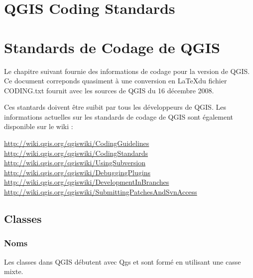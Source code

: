 
\section{QGIS Coding Standards}
\section{Standards de Codage de QGIS}


Le chapitre suivant fournie des informations de codage pour la version \CURRENT de QGIS.
Ce document correponds quasiment \`a une conversion en \LaTeX du fichier CODING.txt fournit 
avec les sources de QGIS du 16 d\'ecembre 2008.

Ces stantards doivent \^etre suibit par tous les d\'eveloppeurs de QGIS. Les informations actuelles
sur les standards de codage de QGIS sont \'egalement disponible sur le wiki :

\url{http://wiki.qgis.org/qgiswiki/CodingGuidelines} \\
\url{http://wiki.qgis.org/qgiswiki/CodingStandards} \\
\url{http://wiki.qgis.org/qgiswiki/UsingSubversion} \\
\url{http://wiki.qgis.org/qgiswiki/DebuggingPlugins} \\
\url{http://wiki.qgis.org/qgiswiki/DevelopmentInBranches} \\
\url{http://wiki.qgis.org/qgiswiki/SubmittingPatchesAndSvnAccess} \\

\subsection{Classes}
\subsubsection{Noms}
Les classes dans QGIS d\'ebutent avec Qgs et sont form\'e en utilisant une casse mixte.

